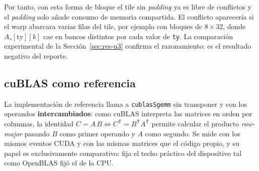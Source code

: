 	Por tanto, con esta forma de bloque el tile sin \textit{padding} ya es libre de conflictos y el \textit{padding} solo añade consumo de memoria compartida. El conflicto aparecería si el warp abarcara varias filas del tile, por ejemplo con bloques de $8 \times 32$, donde $A_s[\text{ty}][k]$ cae en bancos distintos por cada valor de \texttt{ty}. La comparación experimental de la Sección~\ref{sec:res-u3} confirma el razonamiento: es el resultado negativo del reporte.

\subsection{cuBLAS como referencia}

	La implementación de referencia llama a \texttt{cublasSgemm} sin transponer y con los operandos \textbf{intercambiados}: como cuBLAS interpreta las matrices en orden por columnas, la identidad $C = A\,B \iff C^{\mathsf{T}} = B^{\mathsf{T}} A^{\mathsf{T}}$ permite calcular el producto \textit{row-major} pasando $B$ como primer operando y $A$ como segundo. Se mide con los mismos eventos CUDA y con las mismas matrices que el código propio, y su papel es exclusivamente comparativo: fija el techo práctico del dispositivo tal como OpenBLAS fijó el de la CPU.
